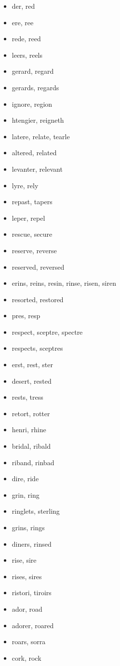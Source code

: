\documentclass[a4wide,11pt]{report}
\begin{document}
\begin{itemize}
  \item der, red
  \item ere, ree
  \item rede, reed
  \item leers, reels
  \item gerard, regard
  \item gerards, regards
  \item ignore, region
  \item htengier, reigneth
  \item latere, relate, tearle
  \item altered, related
  \item levanter, relevant
  \item lyre, rely
  \item repast, tapers
  \item leper, repel
  \item rescue, secure
  \item reserve, reverse
  \item reserved, reversed
  \item erins, reins, resin, rinse, risen, siren
  \item resorted, restored
  \item pres, resp
  \item respect, sceptre, spectre
  \item respects, sceptres
  \item erst, rest, ster
  \item desert, rested
  \item rests, tress
  \item retort, rotter
  \item henri, rhine
  \item bridal, ribald
  \item riband, rinbad
  \item dire, ride
  \item grin, ring
  \item ringlets, sterling
  \item grins, rings
  \item diners, rinsed
  \item rise, sire
  \item rises, sires
  \item ristori, tiroirs
  \item ador, road
  \item adorer, roared
  \item roars, sorra
  \item cork, rock

\end{itemize}
\end{document}
